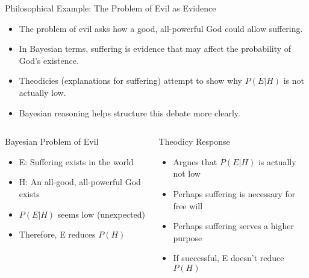 \documentclass{beamer}
\begin{document}
	\begin{frame}{Philosophical Example: The Problem of Evil as Evidence}
		\begin{itemize}
			\item The problem of evil asks how a good, all-powerful God could allow suffering.
			\item In Bayesian terms, suffering is evidence that may affect the probability of God's existence.
			\item Theodicies (explanations for suffering) attempt to show why $P(E|H)$ is not actually low.
			\item Bayesian reasoning helps structure this debate more clearly.
		\end{itemize}
		
		\begin{columns}
			\begin{column}{0.48\textwidth}
				\scriptsize
				\begin{block}{Bayesian Problem of Evil}
					\begin{itemize}
						\item E: Suffering exists in the world
						\item H: An all-good, all-powerful God exists
						\item $P(E|H)$ seems low (unexpected)
						\item Therefore, E reduces $P(H)$
					\end{itemize}
				\end{block}
			\end{column}
			\begin{column}{0.48\textwidth}
				\scriptsize
				\begin{block}{Theodicy Response}
					\begin{itemize}
						\item Argues that $P(E|H)$ is actually not low
						\item Perhaps suffering is necessary for free will
						\item Perhaps suffering serves a higher purpose
						\item If successful, E doesn't reduce $P(H)$
					\end{itemize}
				\end{block}
			\end{column}
		\end{columns}
	\end{frame}
	
\end{document}
